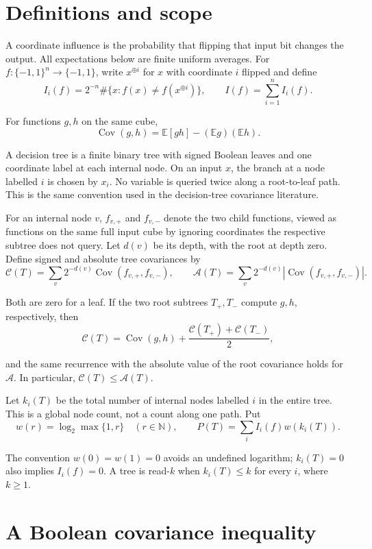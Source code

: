 \documentclass[
  american,
  11pt,
]{article}
\begin{document}
\section{Definitions and scope}\label{definitions-and-scope}

A coordinate influence is the probability that flipping that input bit
changes the output. All expectations below are finite uniform averages.
For \(f:\{-1,1\}^n\to\{-1,1\}\), write \(x^{\oplus i}\) for \(x\) with
coordinate \(i\) flipped and define \[
I_i(f)=2^{-n}\#\{x:f(x)\ne f(x^{\oplus i})\},
\qquad I(f)=\sum_{i=1}^n I_i(f).
\]

For functions \(g,h\) on the same cube, \[
\operatorname{Cov}(g,h)=\mathbb E[gh]-(\mathbb E g)(\mathbb E h).
\]

A decision tree is a finite binary tree with signed Boolean leaves and
one coordinate label at each internal node. On an input \(x\), the
branch at a node labelled \(i\) is chosen by \(x_i\). No
variable is queried twice along a root-to-leaf path. This is the same
convention used in the decision-tree covariance literature.

For an internal node \(v\), \(f_{v,+}\) and \(f_{v,-}\) denote the two
child functions, viewed as functions on the same full input cube by
ignoring coordinates the respective subtree does not query. Let \(d(v)\)
be its depth, with the root at depth zero. Define signed and absolute
tree covariances by \[
\mathcal C(T)=\sum_v2^{-d(v)}\operatorname{Cov}(f_{v,+},f_{v,-}),
\qquad
\mathcal A(T)=\sum_v2^{-d(v)}|\operatorname{Cov}(f_{v,+},f_{v,-})|.
\]

Both are zero for a leaf. If the two root subtrees \(T_+,T_-\) compute
\(g,h\), respectively, then \[
\mathcal C(T)=\operatorname{Cov}(g,h)+\frac{\mathcal C(T_+)+\mathcal C(T_-)}2,
\]

and the same recurrence with the absolute value of the root covariance
holds for \(\mathcal A\). In particular,
\(\mathcal C(T)\leq\mathcal A(T)\).

Let \(k_i(T)\) be the total number of internal nodes labelled \(i\) in
the entire tree. This is a global node count, not a count along one
path. Put \[
w(r)=\log_2\max\{1,r\}\quad(r\in\mathbb N),
\qquad
P(T)=\sum_i I_i(f)w(k_i(T)).
\]

The convention \(w(0)=w(1)=0\) avoids an undefined logarithm;
\(k_i(T)=0\) also implies \(I_i(f)=0\). A tree is read-\(k\) when
\(k_i(T)\leq k\) for every \(i\), where \(k\geq1\).

\section{A Boolean covariance
inequality}\label{a-boolean-covariance-inequality}
\end{document}
